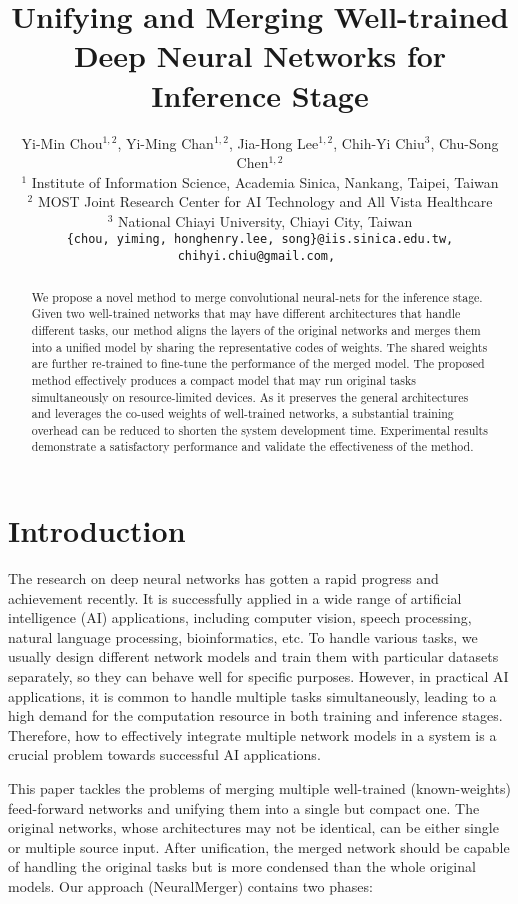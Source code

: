 \documentclass{article}
\title{Unifying and Merging Well-trained Deep Neural Networks for Inference Stage}
\author{
	Yi-Min Chou$^{1,2}$,
	Yi-Ming Chan$^{1,2}$,
	Jia-Hong Lee$^{1,2}$,
	Chih-Yi Chiu$^3$,
	Chu-Song Chen$^{1,2}$
	\\
	$^1$ Institute of Information Science, Academia Sinica, Nankang, Taipei, Taiwan \\
	$^2$ MOST Joint Research Center for AI Technology and All Vista Healthcare\\
	$^3$ National Chiayi University,    Chiayi City, Taiwan  \\
	\tt\small \{chou, yiming, honghenry.lee, song\}@iis.sinica.edu.tw,
	\tt\small chihyi.chiu@gmail.com,
}
\begin{document}
	
	\maketitle
	
	\begin{abstract}
		We propose a novel method to merge convolutional neural-nets for the inference stage.
		Given two well-trained networks that may have different architectures that handle different tasks, our method aligns the layers of the original networks and merges them into a unified model by sharing the representative codes of weights.
		The shared weights are further re-trained to fine-tune the performance of the merged model.
		The proposed method effectively produces a compact model that may run original tasks simultaneously on resource-limited devices.
		As it preserves the general architectures and leverages the co-used weights of well-trained networks, a substantial training overhead can be reduced to shorten the system development time.
		Experimental results demonstrate a satisfactory performance and validate the effectiveness of the method.
	\end{abstract}
	
	\section{Introduction}
	
	The research on deep neural networks has gotten a rapid progress and achievement recently.
	It is successfully applied in a wide range of artificial intelligence (AI) applications, including computer vision, speech processing, natural language processing, bioinformatics, etc.
	To handle various tasks, we usually design different network models and train them with particular datasets separately, so they can behave well for specific purposes.
	However, in practical AI applications, it is common to handle multiple tasks simultaneously, leading to a high demand for the computation resource in both training and inference stages.
	Therefore, how to effectively integrate multiple network models in a system is a crucial problem towards successful AI applications.
	
	This paper tackles the problems of merging multiple well-trained (known-weights) feed-forward networks and unifying them into a single but compact one.
	The original networks, whose architectures may not be identical, can be either single or multiple source input.
	After unification, the merged network should be capable of handling the original tasks but is more condensed than the whole original models.
	Our approach (NeuralMerger) contains two phases:
	
\end{document}
